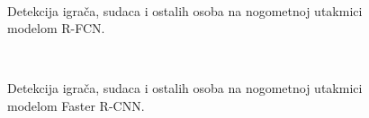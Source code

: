 \begin{figure}[h]
\begin{center}
 \\
\caption{Detekcija igrača, sudaca i ostalih osoba na nogometnoj utakmici modelom R-FCN.}
\label{nogomet_rfcn}
\end{center}
\end{figure}

\begin{figure}[h]
\begin{center}
 \\
\caption{Detekcija igrača, sudaca i ostalih osoba na nogometnoj utakmici modelom Faster R-CNN.}
\label{nogomet_faster}
\end{center}
\end{figure}